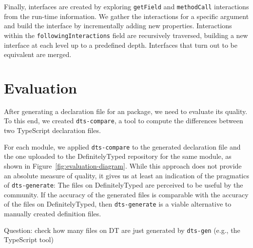 \documentclass[english,cleveref,autoref,submission]{programming}
\newenvironment{changethis}{%
  \begin{tcolorbox}[breakable,notitle,boxrule=0pt,colback=blue!20,colframe=blue!20]}{%
  \end{tcolorbox}}
\newcommand{\figref}[1]{Figure~\ref{#1}}
\begin{document}
Finally, interfaces are created by exploring \texttt{getField} and
\texttt{methodCall} interactions from the run-time information. We
gather the interactions for a specific argument and build the
interface by incrementally adding new properties. Interactions within
the \texttt{followingInteractions} field are recursively traversed,
building a new interface at each level up to a predefined depth. Interfaces that turn out
to be equivalent are merged.

\section{Evaluation}
\label{sec:dts-generate-evaluation}
After generating a declaration file for an \NPM{} package, we need to
evaluate its quality. To this end, we created \texttt{dts-compare}, a tool to compute the
differences between two TypeScript declaration files.

For each module, we applied \texttt{dts-compare} to the generated declaration file and the
one uploaded to the DefinitelyTyped repository for the same module, as shown in
\figref{fig:evaluation-diagram}. While this approach does not provide an absolute measure
of quality, it gives us at least an indication of the pragmatics of \texttt{dts-generate}:
The files on DefinitelyTyped are perceived to be useful by the community. If the accuracy
of the generated files is comparable with the accuracy of the files on DefinitelyTyped,
then \texttt{dts-generate} is a viable alternative to manually created definition files.

\begin{changethis}
  Question: check how many files on DT are just generated by \texttt{dts-gen} (e.g., the TypeScript tool)
\end{changethis}
 
\end{document}

